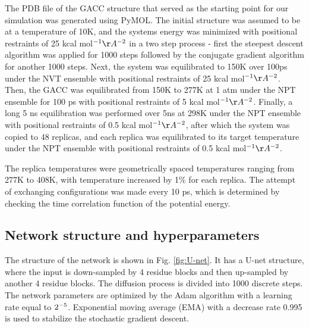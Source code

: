 \documentclass[9pt,twocolumn,twoside]{pnas-new}
\begin{document}
The PDB file of the GACC structure that served as the starting point for our simulation was generated using PyMOL. The initial structure was assumed to be at a temperature of 10K, and the systems energy was minimized with positional restraints of 25 kcal mol$^{-1} \AA^{-2}$ in a two step process - first the steepest descent algorithm was applied for 1000 steps followed by the conjugate gradient algorithm for another 1000 steps. Next, the system was equilibrated to 150K over 100ps under the NVT ensemble with positional restraints of 25 kcal mol$^{-1} \AA^{-2}$. Then, the GACC was equilibrated from 150K to 277K at 1 atm under the NPT ensemble for 100 ps with positional restraints of 5 kcal mol$^{-1} \AA^{-2}$. Finally, a long 5 ns equilibration was performed over 5ns at 298K under the NPT ensemble with positional restraints of 0.5 kcal mol$^{-1} \AA^{-2}$, after which the system was copied to 48 replicas, and each replica was equilibrated to its target temperature under the NPT ensemble with positional restraints of 0.5 kcal mol$^{-1} \AA^{-2}$. 

The replica temperatures were geometrically spaced temperatures ranging from 277K to 408K, with temperature increased by 1$\%$ for each replica. The attempt of exchanging configurations was made every 10 ps, which is determined by checking the time correlation function of the potential energy. 


\subsection*{Network structure and hyperparameters}

The structure of the network is shown in Fig. \ref{fig:U-net}. It has a U-net structure\cite{u_net}, where the input is down-sampled by 4 residue blocks and then up-sampled by another 4 residue blocks. The diffusion process is divided into 1000 discrete steps. The network parameters are optimized by the Adam algorithm \cite{Adam} with a learning rate equal to $2\time 10^{-5}$. Exponential moving average (EMA) with a decrease rate 0.995 is used to stabilize the stochastic gradient descent.  

\showmatmethods{} %

\end{document}
